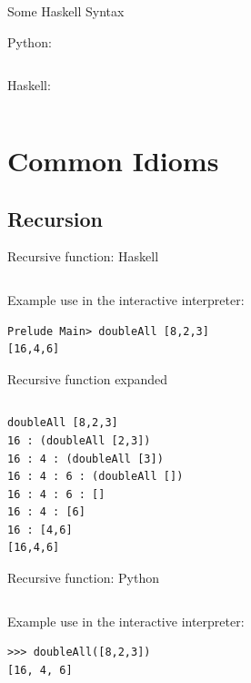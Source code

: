 \documentclass[mathserif]{beamer}
\begin{document}
\begin{frame}{Some Haskell Syntax}

  Python:
  \inputminted[fontsize=\large,firstline=11,lastline=12]{python}{code/python/justfunctions.py}
  \vskip5mm
  Haskell:
  \inputminted[fontsize=\large,firstline=11,lastline=13]{haskell}{code/haskell/justfunctions.hs}

\end{frame}

\section{Common Idioms}
\subsection{Recursion}

\begin{frame}[fragile]{Recursive function: Haskell}

  \inputminted[fontsize=\Large,lastline=3]{haskell}{code/haskell/doubleall_recursion.hs}

  \vskip5mm

Example use in the interactive interpreter:
  \begin{verbatim}
Prelude Main> doubleAll [8,2,3]
[16,4,6]
  \end{verbatim}

\end{frame}

\begin{frame}[fragile]{Recursive function expanded}

  \inputminted[fontsize=\Large,firstline=2,lastline=3]{haskell}{code/haskell/doubleall_recursion.hs}

  \vskip5mm

  \begin{verbatim}
doubleAll [8,2,3]
16 : (doubleAll [2,3])
16 : 4 : (doubleAll [3])
16 : 4 : 6 : (doubleAll [])
16 : 4 : 6 : []
16 : 4 : [6]
16 : [4,6]
[16,4,6]
  \end{verbatim}

\end{frame}

\begin{frame}[fragile]{Recursive function: Python}

  \inputminted[fontsize=\large,firstline=3,lastline=9]{python}{code/python/doubleall_recursion.py}

  \vskip5mm

Example use in the interactive interpreter:

  \begin{verbatim}
>>> doubleAll([8,2,3])
[16, 4, 6]
  \end{verbatim}

\end{frame}
\end{document}
